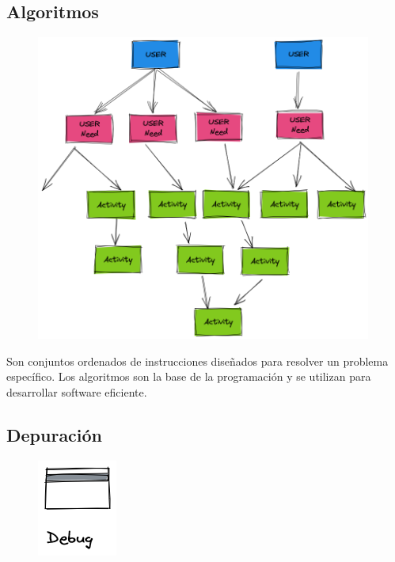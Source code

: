 \documentclass[
  a4paper,
  DIV=11,
  numbers=noendperiod,
  onepage,
  openany]{scrreprt}
\begin{document}
\subsection{Algoritmos}\label{algoritmos}

\begin{figure}

{\centering \includegraphics[width=4.34375in,height=\textheight]{unidades/unidad1/images/algoritmo.png}

}

\end{figure}

Son conjuntos ordenados de instrucciones diseñados para resolver un
problema específico. Los algoritmos son la base de la programación y se
utilizan para desarrollar software eficiente.

\subsection{Depuración}\label{depuraciuxf3n}

\begin{figure}

{\centering \includegraphics{unidades/unidad1/images/debug.png}

}

\end{figure}
\end{document}
